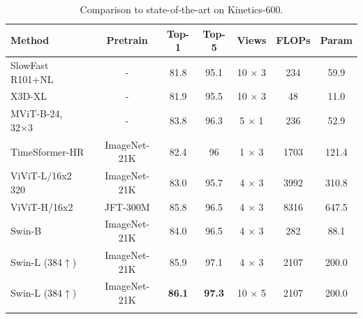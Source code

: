 \documentclass{article}
\newcommand{\demph}[1]{\textcolor[rgb]{0.565,0.565,0.565}{#1}}
\begin{document}
\begin{table}[t]
\caption{Comparison to state-of-the-art on Kinetics-600.}
\centering
  \begin{tabular}{l|c|cc|c|cc}
\Xhline{1.0pt}
  Method & Pretrain & Top-1 & Top-5 & Views & FLOPs & Param  \\
  \hline
  SlowFast R101+NL~\cite{feichtenhofer2019slowfast} & - & 81.8 & 95.1 & 10 × 3 & 234 & 59.9 \\
  X3D-XL~\cite{feichtenhofer2020x3d} & - & 81.9 & 95.5 & 10 × 3 & 48 & 11.0 \\
  MViT-B-24, 32×3~\cite{mvit2021} & - & 83.8 & 96.3 & 5 × 1 & 236 & 52.9 \\
  TimeSformer-HR~\cite{timesformer2021} & ImageNet-21K & 82.4 & 96 & 1 × 3 & 1703 & 121.4\\
  ViViT-L/16x2 320~\cite{arnab2021vivit} & ImageNet-21K & 83.0 & 95.7 & 4 × 3 & 3992& 310.8\\
  \demph{ViViT-H/16x2~\cite{mvit2021}} & \demph{JFT-300M} & \demph{85.8} & \demph{96.5} & \demph{4 × 3} &\demph{8316} & \demph{647.5} \\
  \hline
  Swin-B & ImageNet-21K & 84.0 & 96.5 & 4 × 3 & 282 & 88.1\\
  Swin-L (384$\uparrow$) & ImageNet-21K & {85.9} & {97.1} & 4 × 3 & 2107 & 200.0 \\
  Swin-L (384$\uparrow$) & ImageNet-21K & \textbf{86.1} & \textbf{97.3} & 10 × 5 & 2107 & 200.0   \\
\Xhline{1.0pt}
  \end{tabular}
\label{tab:k600}
\end{table}
\end{document}
